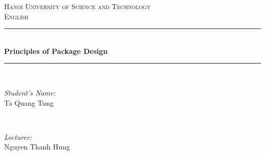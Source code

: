 \documentclass[12pt]{report}
\begin{document}
\begin{titlepage}

\newcommand{\HRule}{\rule{\linewidth}{0.5mm}} %

\center %
 

\textsc{\Large Hanoi University of Science and Technology}\\[1cm] %
\textsc{\large English}\\[0.5cm] %


\HRule \\[0.4cm]
{ \huge \bfseries Principles of Package Design}\\[0.03cm] %
\HRule \\[1.5cm]

 

\begin{minipage}{0.4\textwidth}
\begin{flushleft} \large
\emph{Student's Name:}\\
Ta Quang Tung
\end{flushleft}
\end{minipage}
~
\begin{minipage}{0.4\textwidth}
\begin{flushright} \large
\emph{Lecturer:} \\
Nguyen Thanh Hung
\end{flushright}
\end{minipage}\\[3cm]


\end{titlepage}
\end{document}
